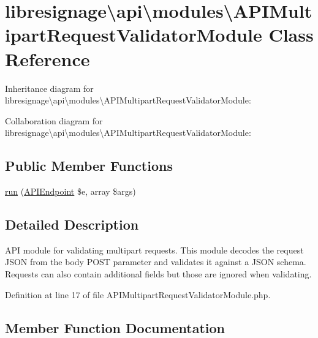 \hypertarget{classlibresignage_1_1api_1_1modules_1_1APIMultipartRequestValidatorModule}{}\section{libresignage\textbackslash{}api\textbackslash{}modules\textbackslash{}A\+P\+I\+Multipart\+Request\+Validator\+Module Class Reference}
\label{classlibresignage_1_1api_1_1modules_1_1APIMultipartRequestValidatorModule}


Inheritance diagram for libresignage\textbackslash{}api\textbackslash{}modules\textbackslash{}A\+P\+I\+Multipart\+Request\+Validator\+Module\+:


Collaboration diagram for libresignage\textbackslash{}api\textbackslash{}modules\textbackslash{}A\+P\+I\+Multipart\+Request\+Validator\+Module\+:
\subsection*{Public Member Functions}
\begin{DoxyCompactItemize}
\item 
\hyperlink{classlibresignage_1_1api_1_1modules_1_1APIMultipartRequestValidatorModule_a6fdea3eced9a6bcee290e3ed3014f0e0}{run} (\hyperlink{classlibresignage_1_1api_1_1APIEndpoint}{A\+P\+I\+Endpoint} \$e, array \$args)
\end{DoxyCompactItemize}


\subsection{Detailed Description}
A\+PI module for validating multipart requests. This module decodes the request J\+S\+ON from the \textquotesingle{}body\textquotesingle{} P\+O\+ST parameter and validates it against a J\+S\+ON schema. Requests can also contain additional fields but those are ignored when validating. 

Definition at line 17 of file A\+P\+I\+Multipart\+Request\+Validator\+Module.\+php.



\subsection{Member Function Documentation}
\mbox{\label{classlibresignage_1_1api_1_1modules_1_1APIMultipartRequestValidatorModule_a6fdea3eced9a6bcee290e3ed3014f0e0}} 
